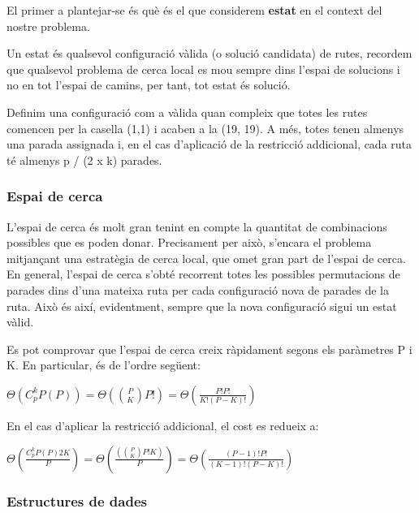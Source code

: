 
El primer a plantejar-se és què és el que considerem \textbf{estat} en el context del nostre problema. 

Un estat és qualsevol configuració vàlida (o solució candidata) de rutes, recordem que qualsevol problema de cerca local es mou sempre dins l'espai de solucions i no en tot l'espai de camins, per tant, tot estat és solució. 

Definim una configuració com a vàlida quan compleix que totes les rutes comencen per la casella (1,1) i acaben a la (19, 19). A més, totes tenen almenys una parada assignada i, en el cas d'aplicació de la restricció addicional, cada ruta té almenys p / (2 x k) parades.

\subsubsection{Espai de cerca} %
\label{sec:espaicerca}

L'espai de cerca és molt gran tenint en compte la quantitat de combinacions possibles que es poden donar. Precisament per això, s'encara el problema mitjançant una estratègia de cerca local, que omet gran part de l'espai de cerca. En general, l'espai de cerca s'obté recorrent totes les possibles permutacions de parades dins d'una mateixa ruta per cada configuració nova de parades de la ruta. Això és així, evidentment, sempre que la nova configuració sigui un estat vàlid. 

Es pot comprovar que l'espai de cerca creix ràpidament segons els paràmetres P i K. En particular, és de l'ordre següent:

\begin{center}
\Large{$\Theta(C_{p}^{k} P(P)) = \Theta({P \choose K} P!) = \Theta(\frac{P!P!}{K!(P-K)!}) $}
\end{center}


En el cas d'aplicar la restricció addicional, el cost es redueix a:

\begin{center}
\Large{$\Theta(\frac{C_{p}^{k} P(P) 2K}{P}) = \Theta(\frac{({P \choose K} P!K)}{P}) = \Theta(\frac{(P-1)!P!}{(K-1)!(P-K)!})$ }
\end{center}

\subsubsection{Estructures de dades}	%

